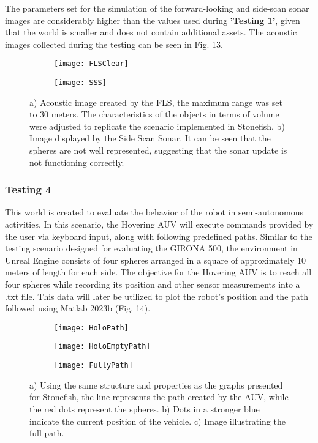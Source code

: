 \documentclass[]{article}
\begin{document}
	The parameters set for the simulation of the forward-looking and side-scan sonar images are considerably higher than the values used during \textbf{'Testing 1'}, given that the world is smaller and does not contain additional assets. The acoustic images collected during the testing can be seen in Fig. 13.
	
	\begin{figure}[H]
		\begin{subfigure}{.6\textwidth}
			\centering
			\texttt{[image: FLSClear]}
			\caption{}
		\end{subfigure}
		\begin{subfigure}{.4\textwidth}
			\centering
			\texttt{[image: SSS]}
			\caption{}
		\end{subfigure}
		\caption{a) Acoustic image created by the FLS, the maximum range was set to 30 meters. The characteristics of the objects in terms of volume were adjusted to replicate the scenario implemented in Stonefish. b) Image displayed by the Side Scan Sonar.  It can be seen that the spheres are not well represented, suggesting that the sonar update is not functioning correctly.}
	\end{figure}


	\subsubsection{Testing 4}
	
	This world is created to evaluate the behavior of the robot in semi-autonomous activities. In this scenario, the Hovering AUV will execute commands provided by the user via keyboard input, along with following predefined paths. Similar to the testing scenario designed for evaluating the GIRONA 500, the environment in Unreal Engine consists of four spheres arranged in a square of approximately 10 meters of length for each side. The objective for the Hovering AUV is to reach all four spheres while recording its position and other sensor measurements into a .txt file. This data will later be utilized to plot the robot's position and the path followed using Matlab 2023b (Fig. 14).
	
	
	\begin{figure}[H]
		\begin{subfigure}{.33\textwidth}
			\centering
			\texttt{[image: HoloPath]}
			\caption{}
		\end{subfigure}
		\begin{subfigure}{.33\textwidth}
			\centering
			\texttt{[image: HoloEmptyPath]}
			\caption{}
		\end{subfigure}
		\begin{subfigure}{.33\textwidth}
			\centering
			\texttt{[image: FullyPath]}
			\caption{}
		\end{subfigure}
		\caption{a) Using the same structure and properties as the graphs presented for Stonefish, the line represents the path created by the AUV, while the red dots represent the spheres. b) Dots in a stronger blue indicate the current position of the vehicle. c) Image illustrating the full path. }
	\end{figure}
\end{document}
